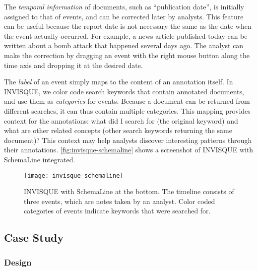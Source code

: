 The \emph{temporal information} of documents, such as ``publication date'', is initially assigned to that of events, and can be corrected later by analysts. This feature can be useful because the report date is not necessary the same as the date when the event actually occurred. For example, a news article published today can be written about a bomb attack that happened several days ago. The analyst can make the correction by dragging an event with the right mouse button along the time axis and dropping it at the desired date. 

The \emph{label} of an event simply maps to the content of an annotation itself. In INVISQUE, we color code search keywords that contain annotated documents, and use them as \emph{categories} for events. Because a document can be returned from different searches, it can thus contain multiple categories. This mapping provides context for the annotations: what did I search for (the original keyword) and what are other related concepts (other search keywords returning the same document)? This context may help analysts discover interesting patterns through their annotations. \autoref{fig:invisque-schemaline} shows a screenshot of INVISQUE with SchemaLine integrated.

\begin{figure}[!htb]
	\centering
	\texttt{[image: invisque-schemaline]}
	\caption{INVISQUE with SchemaLine at the bottom. The timeline consists of three events, which are notes taken by an analyst. Color coded categories of events indicate keywords that were searched for.}
	\label{fig:invisque-schemaline}
\end{figure}

\subsection{Case Study}

\subsubsection{Design}

